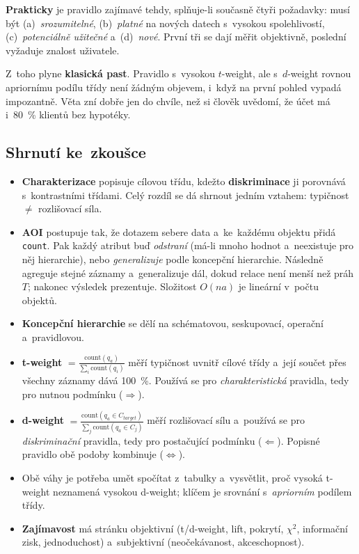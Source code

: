 \documentclass[11pt,a4paper]{article}
\theoremstyle{definition}
\begin{document}
\textbf{Prakticky} je pravidlo zajímavé tehdy, splňuje-li současně čtyři požadavky: musí být
(a)~\emph{srozumitelné}, (b)~\emph{platné} na nových datech s~vysokou spolehlivostí,
(c)~\emph{potenciálně užitečné} a~(d)~\emph{nové}. První tři se dají měřit objektivně,
poslední vyžaduje znalost uživatele.

Z~toho plyne \textbf{klasická past}. Pravidlo s~vysokou $t$-weight, ale s~$d$-weight rovnou
apriornímu podílu třídy není žádným objevem, i~když na první pohled vypadá impozantně. Věta
 zní dobře jen do chvíle, než si člověk
uvědomí, že účet má i~80~\% klientů bez hypotéky.

\subsection{Shrnutí ke~zkoušce}

\begin{itemize}
\item \textbf{Charakterizace} popisuje cílovou třídu, kdežto \textbf{diskriminace} ji
      porovnává s~kontrastními třídami. Celý rozdíl se dá shrnout jedním vztahem: typičnost
      $\neq$ rozlišovací síla.
\item \textbf{AOI} postupuje tak, že dotazem sebere data a~ke~každému objektu přidá
      \texttt{count}. Pak každý atribut buď \emph{odstraní} (má-li mnoho hodnot a~neexistuje
      pro něj hierarchie), nebo \emph{generalizuje} podle koncepční hierarchie. Následně
      agreguje stejné záznamy a~generalizuje dál, dokud relace není menší než práh $T$;
      nakonec výsledek prezentuje. Složitost $O(na)$ je lineární v~počtu objektů.
\item \textbf{Koncepční hierarchie} se dělí na schématovou, seskupovací, operační
      a~pravidlovou.
\item \textbf{t-weight} $=\frac{\mathrm{count}(q_a)}{\sum_i\mathrm{count}(q_i)}$ měří
      typičnost uvnitř cílové třídy a~její součet přes všechny záznamy dává 100~\%. Používá se
      pro \emph{charakteristická} pravidla, tedy pro nutnou podmínku ($\Rightarrow$).
\item \textbf{d-weight} $=\frac{\mathrm{count}(q_a\in C_{target})}{\sum_j\mathrm{count}
      (q_a\in C_j)}$ měří rozlišovací sílu a~používá se pro \emph{diskriminační} pravidla,
      tedy pro postačující podmínku ($\Leftarrow$). Popisné pravidlo obě podoby kombinuje
      ($\Leftrightarrow$).
\item Obě váhy je potřeba umět spočítat z~tabulky a~vysvětlit, proč vysoká t-weight neznamená
      vysokou d-weight; klíčem je srovnání s~\emph{apriorním} podílem třídy.
\item \textbf{Zajímavost} má stránku objektivní (t/d-weight, lift, pokrytí, $\chi^2$,
      informační zisk, jednoduchost) a~subjektivní (neočekávanost, akceschopnost).
\end{itemize}
\end{document}
